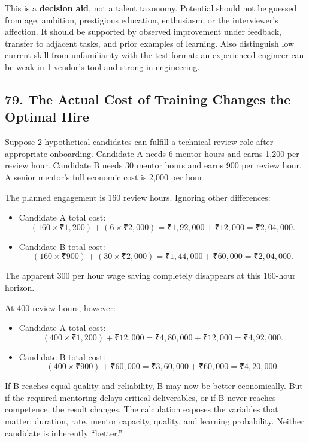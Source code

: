 This is a \textbf{decision aid}, not a talent taxonomy. Potential should not be guessed from age, ambition, prestigious education, enthusiasm, or the interviewer's affection. It should be supported by observed improvement under feedback, transfer to adjacent tasks, and prior examples of learning. Also distinguish low current skill from unfamiliarity with the test format: an experienced engineer can be weak in 1 vendor's tool and strong in engineering.

\subsection*{79. The Actual Cost of Training Changes the Optimal Hire}

Suppose 2 hypothetical candidates can fulfill a technical-review role after appropriate onboarding. Candidate A needs 6 mentor hours and earns 1,200 per review hour. Candidate B needs 30 mentor hours and earns 900 per review hour. A senior mentor's full economic cost is 2,000 per hour.

The planned engagement is 160 review hours. Ignoring other differences:
\begin{itemize}[leftmargin=*]
\item Candidate A total cost:
\begin{equation}
(160 \times \text{₹}1,200) + (6 \times \text{₹}2,000) = \text{₹}1,92,000 + \text{₹}12,000 = \text{₹}2,04,000.
\end{equation}
\item Candidate B total cost:
\begin{equation}
(160 \times \text{₹}900) + (30 \times \text{₹}2,000) = \text{₹}1,44,000 + \text{₹}60,000 = \text{₹}2,04,000.
\end{equation}
\end{itemize}
The apparent 300 per hour wage saving completely disappears at this 160-hour horizon.

At 400 review hours, however:
\begin{itemize}[leftmargin=*]
\item Candidate A total cost:
\begin{equation}
(400 \times \text{₹}1,200) + \text{₹}12,000 = \text{₹}4,80,000 + \text{₹}12,000 = \text{₹}4,92,000.
\end{equation}
\item Candidate B total cost:
\begin{equation}
(400 \times \text{₹}900) + \text{₹}60,000 = \text{₹}3,60,000 + \text{₹}60,000 = \text{₹}4,20,000.
\end{equation}
\end{itemize}
If B reaches equal quality and reliability, B may now be better economically. But if the required mentoring delays critical deliverables, or if B never reaches competence, the result changes. The calculation exposes the variables that matter: duration, rate, mentor capacity, quality, and learning probability. Neither candidate is inherently ``better.''

